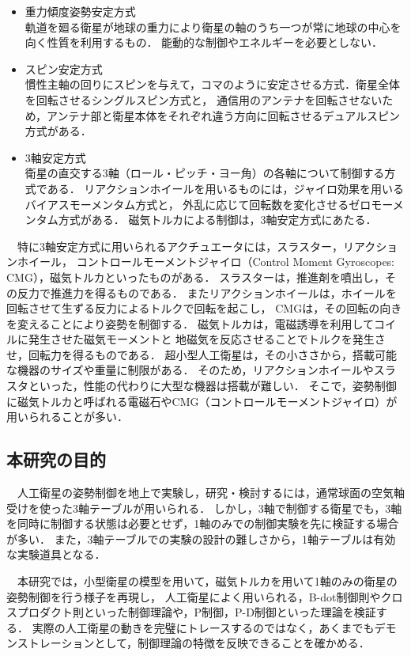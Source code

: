 \begin{itemize}
    \item 重力傾度姿勢安定方式\\
    軌道を廻る衛星が地球の重力により衛星の軸のうち一つが常に地球の中心を向く性質を利用するもの．
    能動的な制御やエネルギーを必要としない．
    \item スピン安定方式\\
    慣性主軸の回りにスピンを与えて，コマのように安定させる方式．衛星全体を回転させるシングルスピン方式と，
    通信用のアンテナを回転させないため，アンテナ部と衛星本体をそれぞれ違う方向に回転させるデュアルスピン方式がある．
    \item 3軸安定方式\\
    衛星の直交する3軸（ロール・ピッチ・ヨー角）の各軸について制御する方式である．
    リアクションホイールを用いるものには，ジャイロ効果を用いるバイアスモーメンタム方式と，
    外乱に応じて回転数を変化させるゼロモーメンタム方式がある．
    磁気トルカによる制御は，3軸安定方式にあたる．
\end{itemize}

　特に3軸安定方式に用いられるアクチュエータには，スラスター，リアクションホイール，
コントロールモーメントジャイロ（Control Moment Gyroscopes: CMG），磁気トルカといったものがある．
スラスターは，推進剤を噴出し，その反力で推進力を得るものである．
またリアクションホイールは，ホイールを回転させて生ずる反力によるトルクで回転を起こし，
CMGは，その回転の向きを変えることにより姿勢を制御する．
磁気トルカは，電磁誘導を利用してコイルに発生させた磁気モーメントと
地磁気を反応させることでトルクを発生させ，回転力を得るものである．
超小型人工衛星は，その小ささから，搭載可能な機器のサイズや重量に制限がある．
そのため，リアクションホイールやスラスタといった，性能の代わりに大型な機器は搭載が難しい．
そこで，姿勢制御に磁気トルカと呼ばれる電磁石やCMG（コントロールモーメントジャイロ）が用いられることが多い．



\subsection{本研究の目的}
　人工衛星の姿勢制御を地上で実験し，研究・検討するには，通常球面の空気軸受けを使った3軸テーブルが用いられる．
しかし，3軸で制御する衛星でも，3軸を同時に制御する状態は必要とせず，1軸のみでの制御実験を先に検証する場合が多い\cite{intro4}．
また，3軸テーブルでの実験の設計の難しさから，1軸テーブルは有効な実験道具となる．

　本研究では，小型衛星の模型を用いて，磁気トルカを用いて1軸のみの衛星の姿勢制御を行う様子を再現し，
人工衛星によく用いられる，B-dot制御則やクロスプロダクト則といった制御理論や，P制御，P-D制御といった理論を検証する．
実際の人工衛星の動きを完璧にトレースするのではなく，あくまでもデモンストレーションとして，制御理論の特徴を反映できることを確かめる．